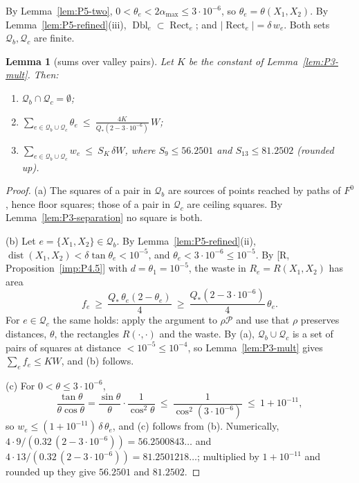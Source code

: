 \documentclass[11pt]{amsart}
\newcommand{\cP}{\mathcal P}
\newcommand{\dist}{\operatorname{dist}}
\newcommand{\amax}{\alpha_{\max}}
\newcommand{\Fz}{F^{0}}
\newtheorem{lemma}[theorem]{Lemma}
\theoremstyle{definition}
\theoremstyle{remark}
\numberwithin{equation}{section}
\begin{document}
By Lemma~\ref{lem:P5-two}, $0<\theta_e<2\amax\le3\cdot10^{-6}$, so $\theta_e=\theta(X_1,X_2)$. By Lemma~\ref{lem:P5-refined}(iii), $\operatorname{Dbl}_e\subset\operatorname{Rect}_e$; and $|\operatorname{Rect}_e|=\delta\,w_e$. Both sets $\mathcal Q_b,\mathcal Q_c$ are finite.

\begin{lemma}[sums over valley pairs]\label{lem:P5-pairsum}
Let $K$ be the constant of Lemma~\ref{lem:P3-mult}. Then:
\begin{enumerate}[label=(\alph*)]
\item $\mathcal Q_b\cap\mathcal Q_c=\emptyset$;
\item $\displaystyle\sum_{e\in\mathcal Q_b\cup\mathcal Q_c}\theta_e\ \le\ \frac{4K}{Q_*(2-3\cdot10^{-6})}\,W$;
\item $\displaystyle\sum_{e\in\mathcal Q_b\cup\mathcal Q_c}w_e\ \le\ S_K\,\delta W$, where $S_9\le56.2501$ and $S_{13}\le81.2502$ (rounded up).
\end{enumerate}
\end{lemma}

\begin{proof}
(a) The squares of a pair in $\mathcal Q_b$ are sources of points reached by paths of $\Fz$, hence floor squares; those of a pair in $\mathcal Q_c$ are ceiling squares. By Lemma~\ref{lem:P3-separation} no square is both.

(b) Let $e=\{X_1,X_2\}\in\mathcal Q_b$. By Lemma~\ref{lem:P5-refined}(ii), $\dist(X_1,X_2)<\delta\tan\theta_e<10^{-5}$, and $\theta_e<3\cdot10^{-6}\le10^{-5}$. By [R, Proposition~\ref{imp:P4.5}] with $d=\theta_1=10^{-5}$, the waste in $R_e=R(X_1,X_2)$ has area
\[
f_e\ \ge\ \frac{Q_*\,\theta_e(2-\theta_e)}{4}\ \ge\ \frac{Q_*(2-3\cdot10^{-6})}{4}\,\theta_e .
\]
For $e\in\mathcal Q_c$ the same holds: apply the argument to $\rho\cP$ and use that $\rho$ preserves distances, $\theta$, the rectangles $R(\cdot,\cdot)$ and the waste. By (a), $\mathcal Q_b\cup\mathcal Q_c$ is a set of pairs of squares at distance $<10^{-5}\le10^{-4}$, so Lemma~\ref{lem:P3-mult} gives $\sum_ef_e\le KW$, and (b) follows.

(c) For $0<\theta\le3\cdot10^{-6}$,
\[
\frac{\tan\theta}{\theta\cos\theta}=\frac{\sin\theta}{\theta}\cdot\frac1{\cos^2\theta}\ \le\ \frac1{\cos^2(3\cdot10^{-6})}\ \le\ 1+10^{-11},
\]
so $w_e\le(1+10^{-11})\,\delta\,\theta_e$, and (c) follows from (b). Numerically, $4\cdot9/(0.32\,(2-3\cdot10^{-6}))=56.2500843\ldots$ and $4\cdot13/(0.32\,(2-3\cdot10^{-6}))=81.2501218\ldots$; multiplied by $1+10^{-11}$ and rounded up they give $56.2501$ and $81.2502$.
\end{proof}
\end{document}
